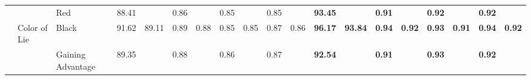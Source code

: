 \begin{table}[!tbh]
{\begin{tabular}{l|l|l|llllllll||llllllll}
                                                                                               &                                  & Red                      & \multicolumn{1}{l|}{88.41} & \multicolumn{1}{l|}{}                        & \multicolumn{1}{l|}{0.86} & \multicolumn{1}{l|}{}                       & \multicolumn{1}{l|}{0.85} & \multicolumn{1}{l|}{}                       & \multicolumn{1}{l|}{0.85} &                        & \multicolumn{1}{l|}{\cellcolor[HTML]{FFFE65}\textbf{93.45}} & \multicolumn{1}{l|}{\cellcolor[HTML]{FFFE65}}                                 & \multicolumn{1}{l|}{\cellcolor[HTML]{FFFE65}\textbf{0.91}} & \multicolumn{1}{l|}{\cellcolor[HTML]{FFFE65}}                                & \multicolumn{1}{l|}{\cellcolor[HTML]{FFFE65}\textbf{0.92}} & \multicolumn{1}{l|}{\cellcolor[HTML]{FFFE65}}                                & \multicolumn{1}{l|}{\cellcolor[HTML]{FFFE65}\textbf{0.92}} & \cellcolor[HTML]{FFFE65}                                \\ \cline{3-4} \cline{6-6} \cline{8-8} \cline{10-10} \cline{12-12} \cline{14-14} \cline{16-16} \cline{18-18}
                                                                                               & \multirow{-4}{*}{Color of Lie}   & Black                    & \multicolumn{1}{l|}{91.62} & \multicolumn{1}{l|}{\multirow{-4}{*}{89.11}} & \multicolumn{1}{l|}{0.89} & \multicolumn{1}{l|}{\multirow{-4}{*}{0.88}} & \multicolumn{1}{l|}{0.85} & \multicolumn{1}{l|}{\multirow{-4}{*}{0.85}} & \multicolumn{1}{l|}{0.87} & \multirow{-4}{*}{0.86} & \multicolumn{1}{l|}{\cellcolor[HTML]{FFFE65}\textbf{96.17}} & \multicolumn{1}{l|}{\multirow{-4}{*}{\cellcolor[HTML]{FFFE65}\textbf{93.84}}} & \multicolumn{1}{l|}{\cellcolor[HTML]{FFFE65}\textbf{0.94}} & \multicolumn{1}{l|}{\multirow{-4}{*}{\cellcolor[HTML]{FFFE65}\textbf{0.92}}} & \multicolumn{1}{l|}{\cellcolor[HTML]{FFFE65}\textbf{0.93}} & \multicolumn{1}{l|}{\multirow{-4}{*}{\cellcolor[HTML]{FFFE65}\textbf{0.91}}} & \multicolumn{1}{l|}{\cellcolor[HTML]{FFFE65}\textbf{0.94}} & \multirow{-4}{*}{\cellcolor[HTML]{FFFE65}\textbf{0.92}} \\ \cline{2-19} 
                                                                                               &                                  & Gaining Advantage        & \multicolumn{1}{l|}{89.35} & \multicolumn{1}{l|}{}                        & \multicolumn{1}{l|}{0.88} & \multicolumn{1}{l|}{}                       & \multicolumn{1}{l|}{0.86} & \multicolumn{1}{l|}{}                       & \multicolumn{1}{l|}{0.87} &                        & \multicolumn{1}{l|}{\cellcolor[HTML]{FFFE65}\textbf{92.54}} & \multicolumn{1}{l|}{\cellcolor[HTML]{FFFE65}}                                 & \multicolumn{1}{l|}{\cellcolor[HTML]{FFFE65}\textbf{0.91}} & \multicolumn{1}{l|}{\cellcolor[HTML]{FFFE65}}                                & \multicolumn{1}{l|}{\cellcolor[HTML]{FFFE65}\textbf{0.93}} & \multicolumn{1}{l|}{\cellcolor[HTML]{FFFE65}}                                & \multicolumn{1}{l|}{\cellcolor[HTML]{FFFE65}\textbf{0.92}} & \cellcolor[HTML]{FFFE65}                                \\ \cline{3-4} \cline{6-6} \cline{8-8} \cline{10-10} \cline{12-12} \cline{14-14} \cline{16-16} \cline{18-18}

\end{tabular}}
\end{table}
